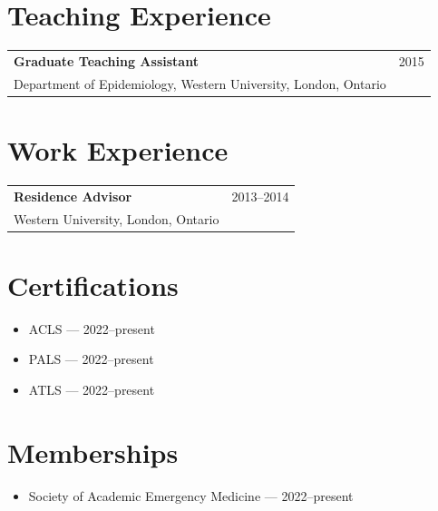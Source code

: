 \documentclass[10.5pt,letterpaper]{article}
\makeatletter
\newcommand{\cvitem}[3]{\begin{tabularx}{\textwidth}{@{}Xr@{}}\textbf{#1} & #2\\ #3 & \end{tabularx}\vspace{3pt}}
\makeatother
\begin{document}
\section{Teaching Experience}
\cvitem{Graduate Teaching Assistant}{2015}{Department of Epidemiology, Western University, London, Ontario}

\section{Work Experience}
\cvitem{Residence Advisor}{2013--2014}{Western University, London, Ontario}

\section{Certifications}
\begin{itemize}\item ACLS --- 2022--present\item PALS --- 2022--present\item ATLS --- 2022--present\end{itemize}

\section{Memberships}
\begin{itemize}\item Society of Academic Emergency Medicine --- 2022--present\end{itemize}
\end{document}
